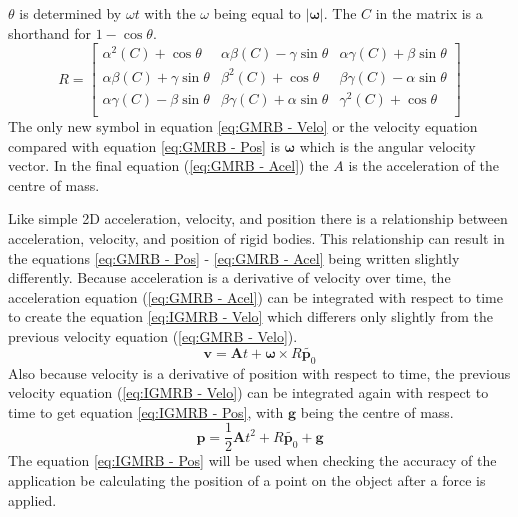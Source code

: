 $\theta$ is determined by $\omega t$ with the $\omega$ being equal to $|\boldsymbol{\omega}|$.
The $C$ in the matrix is a shorthand for $1-\cos\theta$.
\begin{equation}\label{ma:Rotation}
R = 
\begin{bmatrix}
  {\alpha}^{2}(C) + \cos\theta & 
  \alpha\beta(C) - \gamma\sin\theta & 
  \alpha\gamma(C) + \beta\sin\theta \\
  
  \alpha\beta(C) + \gamma\sin\theta & 
  {\beta}^{2}(C) + \cos\theta & 
  \beta\gamma(C) - \alpha\sin\theta \\
  
  \alpha\gamma(C) - \beta\sin\theta & 
  \beta\gamma(C) + \alpha\sin\theta & 
  {\gamma}^{2}(C) + \cos\theta \\
\end{bmatrix}
\end{equation}
The only new symbol in equation \ref{eq:GMRB - Velo} or the velocity equation compared with equation \ref{eq:GMRB - Pos} is $\boldsymbol{\omega}$ which is the angular velocity vector. In the final equation (\ref{eq:GMRB - Acel}) the $A$ is the acceleration of the centre of mass.

Like simple 2D acceleration, velocity, and position there is a relationship between acceleration, velocity, and position of rigid bodies.
This relationship can result in the equations \ref{eq:GMRB - Pos} - \ref{eq:GMRB - Acel} being written slightly differently.
Because acceleration is a derivative of velocity over time, the acceleration equation (\ref{eq:GMRB - Acel}) can be integrated with respect to time to create the equation \ref{eq:IGMRB - Velo} which differers only slightly from the previous velocity equation (\ref{eq:GMRB - Velo}).
\begin{equation}\label{eq:IGMRB - Velo}
\mathbf{v}=\mathbf{A}t+\boldsymbol\omega\times{R}\tilde{\mathbf{p}_{0}}
\end{equation}
Also because velocity is a derivative of position with respect to time, the previous velocity equation (\ref{eq:IGMRB - Velo}) can be integrated again with respect to time to get equation \ref{eq:IGMRB - Pos}, with $\mathbf{g}$ being the centre of mass.
\begin{equation}\label{eq:IGMRB - Pos}
\mathbf{p}=\frac{1}{2}\mathbf{A}t^{2}+{R}\tilde{\mathbf{p}_{0}}+\mathbf{g}
\end{equation}
The equation \ref{eq:IGMRB - Pos} will be used when checking the accuracy of the application be calculating the position of a point on the object after a force is applied.
